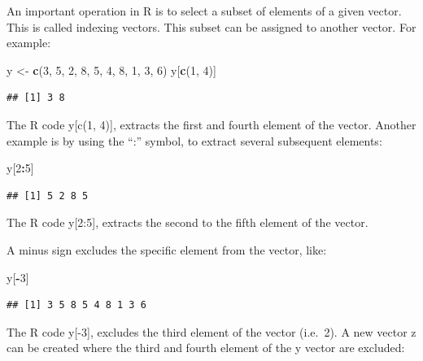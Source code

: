 \documentclass[
]{book}
\newenvironment{Shaded}{\begin{snugshade}}{\end{snugshade}}
\newcommand{\DecValTok}[1]{\textcolor[rgb]{0.00,0.00,0.81}{#1}}
\newcommand{\KeywordTok}[1]{\textcolor[rgb]{0.13,0.29,0.53}{\textbf{#1}}}
\newcommand{\NormalTok}[1]{#1}
\newcommand{\OperatorTok}[1]{\textcolor[rgb]{0.81,0.36,0.00}{\textbf{#1}}}
\newcommand{\StringTok}[1]{\textcolor[rgb]{0.31,0.60,0.02}{#1}}
\begin{document}
An important operation in R is to select a subset of elements of a given
vector. This is called indexing vectors. This subset can be assigned to
another vector. For example:

\begin{Shaded}
\begin{Highlighting}[]
\NormalTok{y <-}\StringTok{ }\KeywordTok{c}\NormalTok{(}\DecValTok{3}\NormalTok{, }\DecValTok{5}\NormalTok{, }\DecValTok{2}\NormalTok{, }\DecValTok{8}\NormalTok{, }\DecValTok{5}\NormalTok{, }\DecValTok{4}\NormalTok{, }\DecValTok{8}\NormalTok{, }\DecValTok{1}\NormalTok{, }\DecValTok{3}\NormalTok{, }\DecValTok{6}\NormalTok{)}
\NormalTok{y[}\KeywordTok{c}\NormalTok{(}\DecValTok{1}\NormalTok{, }\DecValTok{4}\NormalTok{)]}
\end{Highlighting}
\end{Shaded}

\begin{verbatim}
## [1] 3 8
\end{verbatim}

The R code y{[}c(1, 4){]}, extracts the first and fourth element of the
vector. Another example is by using the ``:'' symbol, to extract several
subsequent elements:

\begin{Shaded}
\begin{Highlighting}[]
\NormalTok{y[}\DecValTok{2}\OperatorTok{:}\DecValTok{5}\NormalTok{]}
\end{Highlighting}
\end{Shaded}

\begin{verbatim}
## [1] 5 2 8 5
\end{verbatim}

The R code y{[}2:5{]}, extracts the second to the fifth element of the
vector.

A minus sign excludes the specific element from the vector, like:

\begin{Shaded}
\begin{Highlighting}[]
\NormalTok{y[}\OperatorTok{-}\DecValTok{3}\NormalTok{]}
\end{Highlighting}
\end{Shaded}

\begin{verbatim}
## [1] 3 5 8 5 4 8 1 3 6
\end{verbatim}

The R code y{[}-3{]}, excludes the third element of the vector (i.e.~2).
A new vector z can be created where the third and fourth element of the
y vector are excluded:
\end{document}
